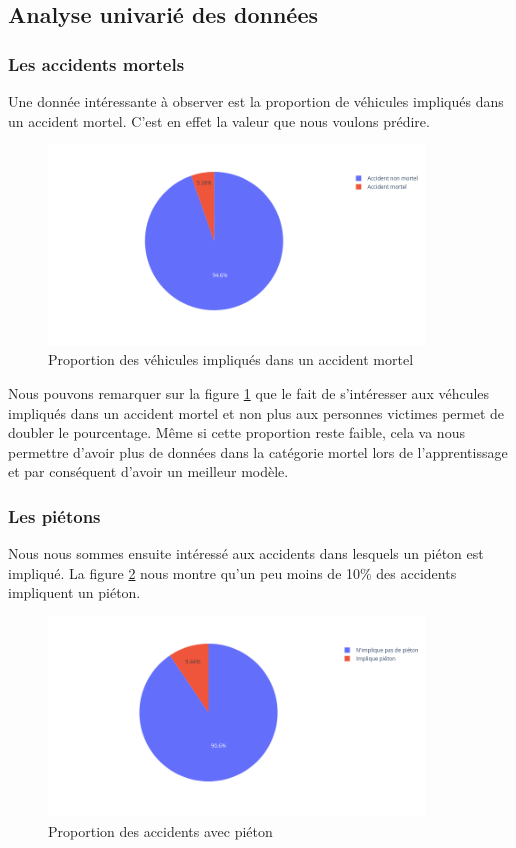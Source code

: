 \documentclass[]{article}
\begin{document}
    \subsection{Analyse univarié des données}
    \subsubsection{Les accidents mortels}
    Une donnée intéressante à observer est la proportion de véhicules impliqués dans un accident 
    mortel. C'est en effet la valeur que nous voulons prédire.

    \begin{figure}[ht]
        \centering
        \includegraphics[width=10cm]{./img/grav2.png}
        \caption{Proportion des véhicules impliqués dans un accident mortel}
        \label{fig:fig_acc_mortel}
    \end{figure}

    Nous pouvons remarquer sur la figure \ref{fig:fig_acc_mortel} que le fait de s'intéresser 
    aux véhcules impliqués dans un accident mortel et non plus aux personnes victimes permet 
    de doubler le pourcentage. Même si cette proportion reste faible, cela va nous permettre 
    d'avoir plus de données dans la catégorie mortel lors de l'apprentissage et par conséquent 
    d'avoir un meilleur modèle.

    \subsubsection{Les piétons}
    Nous nous sommes ensuite intéressé aux accidents dans lesquels un piéton est impliqué. 
    La figure \ref{fig:fig_acc_pieton} nous montre qu'un peu moins de 10\% des accidents impliquent 
    un piéton.

    \begin{figure}[ht]
        \centering
        \includegraphics[width=10cm]{./img/pieton.png}
        \caption{Proportion des accidents avec piéton}
        \label{fig:fig_acc_pieton}
    \end{figure}
\end{document}
